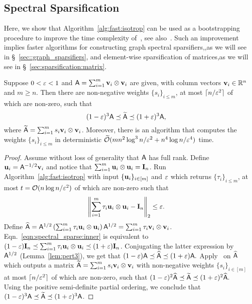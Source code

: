 \subsection{Spectral Sparsification}\label{sec:sparsif:psd}
Here, we show that Algorithm~\ref{alg:fast:isotrop} can be used as a bootstrapping procedure to improve the time complexity of~\cite[Theorem~3.1]{phdthesis:Srivastava:2010}, see also~\cite[Theorem~$3.1$]{graph:sparsifiers:twice_ram}. Such an improvement implies faster algorithms for constructing graph spectral sparsifiers,,as we will see in \S~\ref{sec::graph_sparsifiers}, and element-wise sparsification of matrices,as we will see in \S~\ref{sec:sparsification:matrix}.
\begin{theorem}\label{thm:sparsification:here}
Suppose $0 < \varepsilon < 1$ and ${\mathsf{A} } = \sum_{i=1}^{m} {\mathbf v}_i \otimes {\mathbf v}_i $ are given, with column vectors ${\mathbf v}_i\in\mathbb{R}^n $ and $m\geq n$. Then there are non-negative weights $\{s_i\}_{i\leq m}$, at most $ \lceil n/\varepsilon^2 \rceil$ of which are non-zero, such that
\begin{equation}
	(1-\varepsilon)^3 {\mathsf{A} } \preceq \widetilde{{\mathsf{A} }} \preceq (1+\varepsilon)^3 {\mathsf{A} },
\end{equation}
where $\widetilde{{\mathsf{A} }} = \sum_{i=1}^{m}s_i {\mathbf v}_i \otimes {\mathbf v}_i$. Moreover, there is an algorithm that computes the weights $\{s_i\}_{i\leq m}$ in deterministic $\widetilde{\mathcal{O}}(mn^2 \log^3 n  /\varepsilon^2 + n^4 \log n /\varepsilon^4)$ time.
\end{theorem}
\begin{proof}
Assume without loss of generality that ${\mathsf{A} }$ has full rank. Define ${\mathbf u}_i = {\mathsf{A} }^{-1/2}{\mathbf v}_i$ and notice that $\sum_{i=1}^{m} {\mathbf u}_i \otimes {\mathbf u}_i =\mathbf{I}_n$. Run Algorithm~\ref{alg:fast:isotrop} with input $\{{\mathbf u}_i\}_{i\in{[m]}}$ and $\varepsilon$ which returns $\{\tau_i\}_{i\leq m}$, at most $t=\mathcal{O}(n\log n /\varepsilon^2)$ of which are non-zero such that
\begin{equation}\label{eqn:spectral_sparse:inner}
\left\|\sum_{i=1}^{m} \tau_i {\mathbf u}_i \otimes {\mathbf u}_i - \mathbf{I}_n \right\|_2 \leq \varepsilon.
\end{equation}
Define $\widehat{{\mathsf{A} }} = {\mathsf{A} }^{1/2}\left(\sum_{i=1}^{m}\tau_i {\mathbf u}_i \otimes {\mathbf u}_i\right) {\mathsf{A} }^{1/2} = \sum_{i=1}^{m}\tau_i {\mathbf v}_i\otimes {\mathbf v}_i$. Eqn.~\eqref{eqn:spectral_sparse:inner} is equivalent to $(1-\varepsilon) \mathbf{I}_n \preceq \sum_{i=1}^{m} \tau_i {\mathbf u}_i\otimes {\mathbf u}_i \preceq (1+\varepsilon) \mathbf{I}_n$. Conjugating the latter expression by ${\mathsf{A} }^{1/2}$ (Lemma~\ref{lem:pert3}), we get that $ (1-\varepsilon) {\mathsf{A} } \preceq \widehat{{\mathsf{A} }} \preceq (1+\varepsilon) {\mathsf{A} }.$ Apply~\cite[Theorem~3.1]{phdthesis:Srivastava:2010} on $\widehat{{\mathsf{A} }}$ which outputs a matrix $\widetilde{{\mathsf{A} }}=\sum_{i=1}^{m}s_i {\mathbf v}_i\otimes {\mathbf v}_i$ with non-negative weights $\{s_i\}_{i\in{[m]}}$ at most $\lceil n /\varepsilon^2 \rceil$ of which are non-zero, such that $ (1-\varepsilon)^2 \widehat{{\mathsf{A} }} \preceq \widetilde{{\mathsf{A} }} \preceq (1+\varepsilon)^2 \widehat{{\mathsf{A} }}.$ Using the positive semi-definite partial ordering, we conclude that $(1-\varepsilon)^3 {\mathsf{A} } \preceq \widetilde{{\mathsf{A} }} \preceq (1+\varepsilon)^3 {\mathsf{A} }$.
\end{proof}
